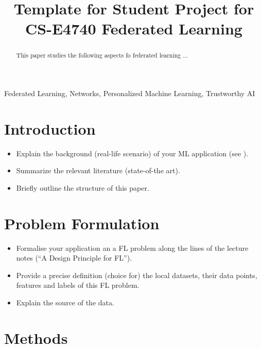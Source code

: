 \documentclass{article}
\title{Template for Student Project for \\ 
	CS-E4740 Federated Learning}
\begin{document}
%
\maketitle
%
\begin{abstract}
This paper studies the following aspects fo federated learning ...
\end{abstract}
%
\begin{keywords}
Federated Learning, Networks, Personalized Machine Learning, Trustworthy AI 
\end{keywords}
%
\section{Introduction}
\label{sec:intro}
\begin{itemize}
\item Explain the background (real-life scenario) of your ML application (see \cite[Ch. 2]{MLBasics}).  
\item Summarize the relevant literature (state-of-the art). 
\item Briefly outline the structure of this paper. 
\end{itemize}


\section{Problem Formulation}
\label{sec:pf}

\begin{itemize} 
\item Formalise your application an a FL problem along the lines of the lecture notes (``A Design Principle for FL''). 
\item Provide a precise definition (choice for) the local datasets, their data points, features and labels of this FL problem. 
\item Explain the source of the data. 
\end{itemize} 

\section{Methods} 
\label{sec_methods} 
\end{document}
